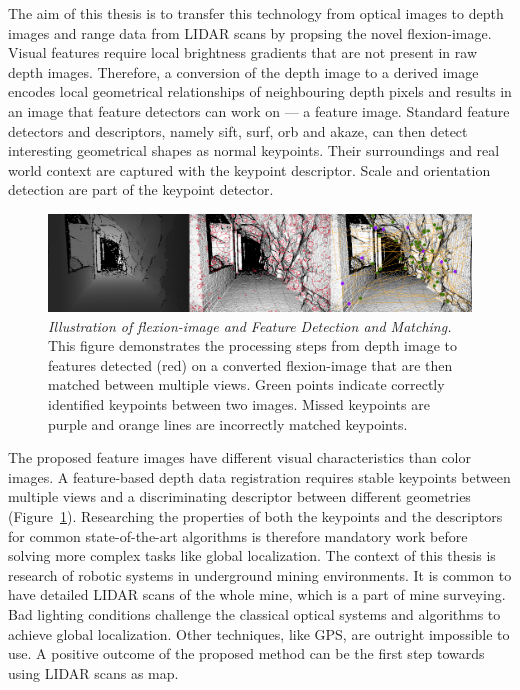 The aim of this thesis is to transfer this technology from optical images to depth images and range data from \acrshort{LIDAR} scans by propsing the novel \Gls{flexion-image}.
Visual features require local brightness gradients that are not present in raw depth images.
Therefore, a conversion of the depth image to a derived image encodes local geometrical relationships of neighbouring depth pixels and results in an image that feature detectors can work on --- a feature image.
Standard feature detectors and descriptors, namely \acrshort{sift}, \acrshort{surf}, \acrshort{orb} and \acrshort{akaze}, can then detect interesting geometrical shapes as normal keypoints.
Their surroundings and real world context are captured with the keypoint descriptor.
Scale and orientation detection are part of the keypoint detector.
\begin{figure}[htb]
    \includegraphics[width=\linewidth]{chapter01/masterarbeit_method.png}
    \caption[Illustration of \Gls{flexion-image} and Feature Detection and Matching]{\emph{Illustration of \Gls{flexion-image} and Feature Detection and Matching.} This figure demonstrates the processing steps from depth image to features detected (red) on a converted \gls{flexion-image} that are then matched between multiple views. Green points indicate correctly identified keypoints between two images. Missed keypoints are purple and orange lines are incorrectly matched keypoints.}\label{fig:method_example}
\end{figure}
The proposed feature images have different visual characteristics than color images.
A \gls{feature}-based depth data registration requires stable keypoints between multiple views and a discriminating descriptor between different geometries (Figure~\ref{fig:method_example}).
Researching the properties of both the keypoints and the descriptors for common state-of-the-art algorithms is therefore mandatory work before solving more complex tasks like global localization.
The context of this thesis is research of robotic systems in underground mining environments.
It is common to have detailed \acrshort{LIDAR} scans of the whole mine, which is a part of mine surveying.
Bad lighting conditions challenge the classical optical systems and algorithms to achieve global localization.
Other techniques, like GPS, are outright impossible to use.
A positive outcome of the proposed method can be the first step towards using \acrshort{LIDAR} scans as map.

